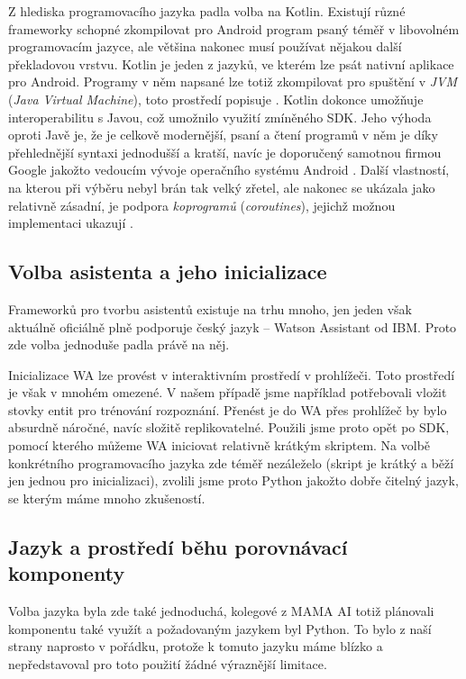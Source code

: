 Z hlediska programovacího jazyka padla volba na Kotlin. Existují různé frameworky
schopné zkompilovat pro Android program psaný téměř v libovolném programovacím
jazyce, ale většina nakonec musí používat nějakou další překladovou vrstvu.
Kotlin je jeden z jazyků, ve kterém lze psát nativní aplikace pro Android. Programy
v něm napsané lze totiž zkompilovat pro spuštění v \textit{JVM} (\textit{Java Virtual Machine}),
toto prostředí popisuje \citet{prof_tejinder_singh_hotspot_2014}.
Kotlin dokonce umožňuje interoperabilitu s Javou, což umožnilo
využití zmíněného SDK. Jeho výhoda oproti Javě je, že je celkově modernější,
psaní a čtení programů v něm je díky přehlednější syntaxi jednodušší a kratší,
navíc je doporučený samotnou firmou Google jakožto vedoucím vývoje operačního
systému Android \citep{android_blog}.
Další vlastností, na kterou při výběru nebyl brán tak velký
zřetel, ale nakonec se ukázala jako relativně zásadní, je podpora \textit{koprogramů}
(\textit{coroutines}), jejichž možnou implementaci ukazují \citet{theory_practice_coroutines}.

\subsection{Volba asistenta a jeho inicializace}
Frameworků pro tvorbu asistentů existuje na trhu mnoho, jen jeden však aktuálně oficiálně plně
podporuje český jazyk -- Watson Assistant od IBM. Proto zde volba jednoduše
padla právě na něj.

Inicializace WA lze provést v interaktivním prostředí v prohlížeči. Toto
prostředí je však v mnohém omezené. V našem případě jsme například potřebovali
vložit stovky entit pro trénování rozpoznání. Přenést je do WA přes prohlížeč
by bylo absurdně náročné, navíc složitě replikovatelné. Použili jsme proto opět
po SDK, pomocí kterého můžeme WA iniciovat relativně krátkým skriptem. Na volbě
konkrétního programovacího jazyka zde téměř nezáleželo (skript je krátký a běží
jen jednou pro inicializaci), zvolili jsme proto Python jakožto dobře čitelný
jazyk, se kterým máme mnoho zkušeností.

\subsection{Jazyk a prostředí běhu porovnávací komponenty}

Volba jazyka byla zde také jednoduchá, kolegové z MAMA AI totiž plánovali
komponentu také využít a požadovaným jazykem byl Python. To bylo z naší
strany naprosto v pořádku, protože k tomuto jazyku máme blízko a nepředstavoval
pro toto použití žádné výraznější limitace.

